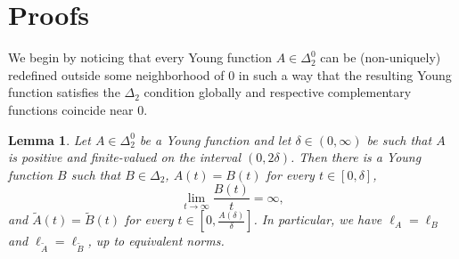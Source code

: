 \documentclass[nointlimits]{amsart}
\numberwithin{equation}{section}
\theoremstyle{plain}
\newtheorem{lemma}[theorem]{Lemma}
\theoremstyle{definition}
\newcommand{\DTwo}{\Delta_2}
\newcommand{\DTwoZ}{\DTwo^0}
\newcommand{\tA}{\tilde{A}}
\newcommand{\lA}{\ell_A}
\begin{document}
\section{Proofs}

We begin by noticing that every Young function $A\in\DTwoZ$ can be (non-uniquely) redefined outside some neighborhood of $0$ in such a way that the resulting Young function satisfies the $\DTwo$ condition globally and respective complementary functions coincide near $0$.
\begin{lemma}\label{lem:better_Young_function}
Let $A\in\DTwoZ$ be a Young function and let $\delta\in(0, \infty)$ be such that $A$ is positive and finite-valued on the interval $(0, 2\delta)$. Then there is a Young function $B$ such that $B\in\DTwo$, $A(t)=B(t)$ for every $t\in[0,\delta]$,
\begin{equation}\label{E:better_Young_function:not_linear_near_infty}
    \lim_{t\to\infty}\frac{B(t)}{t} = \infty,
\end{equation} 
 and $\tA(t) = \tilde{B}(t)$ for every $t\in[0,\frac{A(\delta)}{\delta}]$. In particular, we have $\lA = \ell_B$ and $\ell_{\tA} = \ell_{\tilde{B}}$, up to equivalent norms.
\end{lemma}
\end{document}
